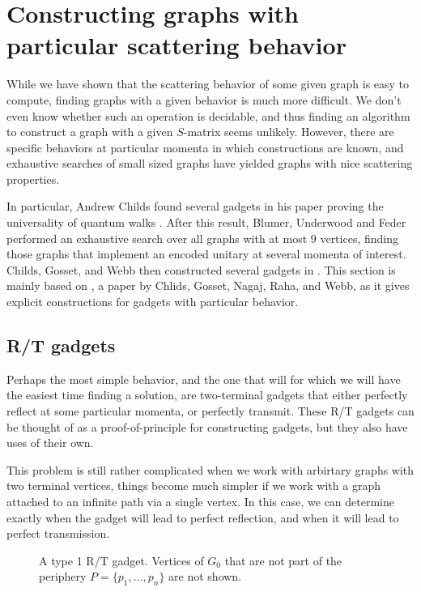 \documentclass[../thesis-main/thesis-main]{subfiles}
\begin{document}
\section{Constructing graphs with particular scattering behavior}

While we have shown that the scattering behavior of some given graph is easy to compute, finding graphs with a given behavior is much more difficult.  We don't even know whether such an operation is decidable, and thus finding an algorithm to construct a graph with a given $S$-matrix seems unlikely.  However, there are specific behaviors at particular momenta in which constructions are known, and exhaustive searches of small sized graphs have yielded graphs with nice scattering properties.  

In particular, Andrew Childs found several gadgets in his paper proving the universality of quantum walks \cite{Chi09}.  After this result, Blumer, Underwood and Feder \cite{BUF11} performed an exhaustive search over all graphs with at most 9 vertices, finding those graphs that implement an encoded unitary at several momenta of interest.  Childs, Gosset, and Webb then constructed several gadgets in \cite{MPQW}.  This section is mainly based on \cite{MomSwitches}, a paper by Chlids, Gosset, Nagaj, Raha, and Webb, as it gives explicit constructions for gadgets with particular behavior.


\subsection{R/T gadgets}\label{sec:rt_gadgets}
 
Perhaps the most simple behavior, and the one that will for which we will have the easiest time finding a solution, are two-terminal gadgets that either perfectly reflect at some particular momenta, or perfectly transmit.  These R/T gadgets can be thought of as a proof-of-principle for constructing gadgets, but they also have uses of their own.

This problem is still rather complicated when we work with arbirtary graphs with two terminal vertices, things become much simpler if we work with a graph attached to an infinite path via a single vertex.  In this case, we can determine exactly when the gadget will lead to perfect reflection, and when it will lead to perfect transmission.

\begin{figure}
  \centering
  
  \caption[A type 1 R/T gadget]{A type 1 R/T gadget.  Vertices of $G_0$ that are not part of the periphery $P = \{p_1,\ldots,p_n\}$ are not shown.}
  \label{fig:reversal_orig}
\end{figure}
\end{document}
